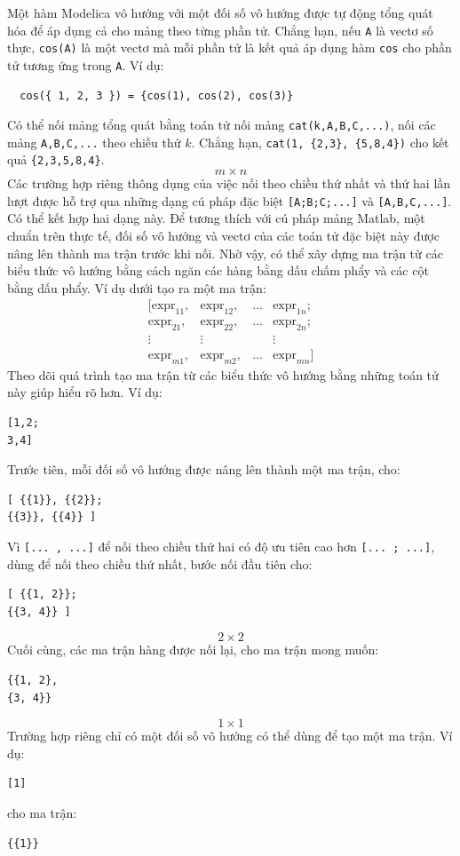 Một hàm Modelica vô hướng với một đối số vô hướng được tự động tổng quát hóa để áp dụng cả cho mảng theo từng phần tử. Chẳng hạn, nếu \texttt{A} là vectơ số thực, \texttt{cos(A)} là một vectơ mà mỗi phần tử là kết quả áp dụng hàm \texttt{cos} cho phần tử tương ứng trong \texttt{A}. Ví dụ:
\begin{verbatim}
  cos({ 1, 2, 3 }) = {cos(1), cos(2), cos(3)}
\end{verbatim}
Có thể nối mảng tổng quát bằng toán tử nối mảng \texttt{cat(k,A,B,C,...)}, nối các mảng \texttt{A,B,C,...} theo chiều thứ $k$. Chẳng hạn, \texttt{cat(1, \{2,3\}, \{5,8,4\})} cho kết quả \texttt{\{2,3,5,8,4\}}.
\[m\times n\]
Các trường hợp riêng thông dụng của việc nối theo chiều thứ nhất và thứ hai lần lượt được hỗ trợ qua những dạng cú pháp đặc biệt \texttt{[A;B;C;...]} và \texttt{[A,B,C,...]}. Có thể kết hợp hai dạng này. Để tương thích với cú pháp mảng Matlab, một chuẩn trên thực tế, đối số vô hướng và vectơ của các toán tử đặc biệt này được nâng lên thành ma trận trước khi nối. Nhờ vậy, có thể xây dựng ma trận từ các biểu thức vô hướng bằng cách ngăn các hàng bằng dấu chấm phẩy và các cột bằng dấu phẩy. Ví dụ dưới tạo ra một ma trận:
\[
\begin{array}{llll}
[\mathrm{expr}_{11},&\mathrm{expr}_{12},&\ldots&\mathrm{expr}_{1n};\\
\mathrm{expr}_{21},&\mathrm{expr}_{22},&\ldots&\mathrm{expr}_{2n};\\
\vdots&\vdots&&\vdots\\
\mathrm{expr}_{m1},&\mathrm{expr}_{m2},&\ldots&\mathrm{expr}_{mn}]
\end{array}
\]
Theo dõi quá trình tạo ma trận từ các biểu thức vô hướng bằng những toán tử này giúp hiểu rõ hơn. Ví dụ:
\begin{verbatim}
[1,2;
3,4]
\end{verbatim}
Trước tiên, mỗi đối số vô hướng được nâng lên thành một ma trận, cho:
\begin{verbatim}
[ {{1}}, {{2}};
{{3}}, {{4}} ]
\end{verbatim}
Vì \texttt{[... , ...]} để nối theo chiều thứ hai có độ ưu tiên cao hơn \texttt{[... ; ...]}, dùng để nối theo chiều thứ nhất, bước nối đầu tiên cho:
\begin{verbatim}
[ {{1, 2}};
{{3, 4}} ]
\end{verbatim}

\[2\times2\]
Cuối cùng, các ma trận hàng được nối lại, cho ma trận mong muốn:
\begin{verbatim}
{{1, 2},
{3, 4}}
\end{verbatim}
\[1\times1\]
Trường hợp riêng chỉ có một đối số vô hướng có thể dùng để tạo một ma trận. Ví dụ:
\begin{verbatim}
[1]
\end{verbatim}
cho ma trận:
\begin{verbatim}
{{1}}
\end{verbatim}


